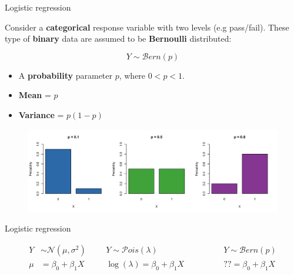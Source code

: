 \documentclass[pdf,handout]{beamer}
\begin{document}
\begin{frame}{Logistic regression}

Consider a \textbf{categorical} response variable with two levels (e.g pass/fail). 
These type of \textbf{binary} data are assumed to be \textbf{Bernoulli} distributed:

$$
Y \sim \mathcal{B}ern(p)
$$

\begin{itemize}\addtolength{\itemsep}{.25\baselineskip}
    \item A \textbf{probability} parameter $p$, where $0 < p < 1$.
    \item \textbf{Mean} = $p$  
    \item \textbf{Variance} = $p(1 - p)$
\end{itemize}

\begin{figure}
\includegraphics[width=.9\textwidth]{berndist.png}
\end{figure}

\end{frame}

\begin{frame}{Logistic regression}

$$
\begin{aligned}
Y & \sim \mathcal{N}(\mu, \sigma^2) &&& Y  \sim \mathcal{P}ois(\lambda) &&&&&& Y  \sim \mathcal{B}ern(p)\\
\mu & = \beta_0 + \beta_1X &&& \log({\lambda}) = \beta_0 + \beta_1X &&&&&& ?? = \beta_0 + \beta_1X
\end{aligned}
$$

\vfill


\end{frame}
\end{document}
